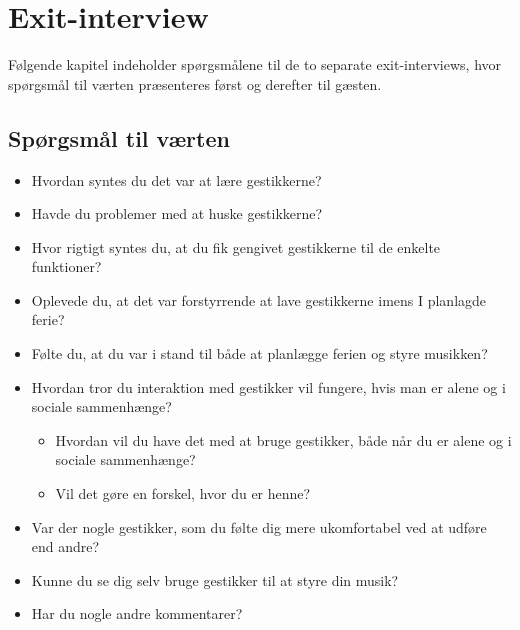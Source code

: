 \chapter{Exit-interview}
\label{app:ExitInterviewSocialAccept}
%
Følgende kapitel indeholder spørgsmålene til de to separate exit-interviews, hvor spørgsmål til værten præsenteres først og derefter til gæsten. \blankline
%
\section{Spørgsmål til værten}
\label{app:ExitInterviewVaert}
%
\begin{itemize}
  \item Hvordan syntes du det var at lære gestikkerne?
  \item Havde du problemer med at huske gestikkerne?
  \item Hvor rigtigt syntes du, at du fik gengivet gestikkerne til de enkelte funktioner? 
  \item Oplevede du, at det var forstyrrende at lave gestikkerne imens I planlagde ferie? 
  \item Følte du, at du var i stand til både at planlægge ferien og styre musikken?
  \item Hvordan tror du interaktion med gestikker vil fungere, hvis man er alene og i sociale sammenhænge?
  \begin{itemize}
  	\item Hvordan vil du have det med at bruge gestikker, både når du er alene og i sociale sammenhænge?
  	\item Vil det gøre en forskel, hvor du er henne?
  \end{itemize}  
  \item Var der nogle gestikker, som du følte dig mere ukomfortabel ved at udføre end andre? 
  \item Kunne du se dig selv bruge gestikker til at styre din musik? 
  \item Har du nogle andre kommentarer? 
\end{itemize}
%
